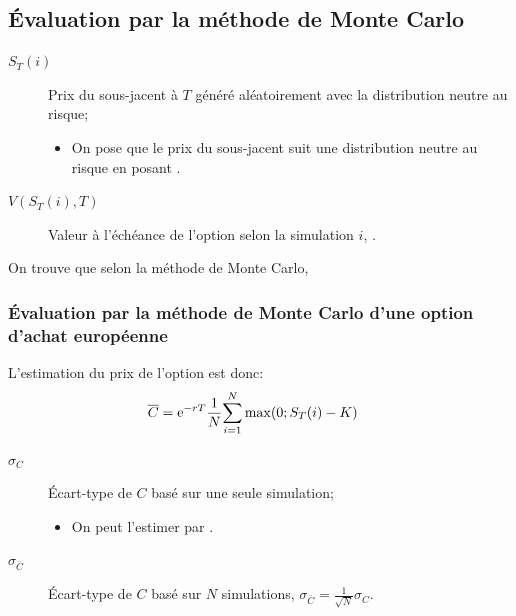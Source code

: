 \documentclass[10pt, french]{article}
\begin{document}
\begin{multicols*}{2}
\columnbreak
\subsection{Évaluation par la méthode de Monte Carlo}
\begin{distributions}[Notation]
\begin{description}
	\item[$S_{T}(i)$]	Prix du sous-jacent à $T$ généré aléatoirement avec la distribution neutre au risque;
		\begin{itemize}
		\item	On pose que le prix du sous-jacent suit une distribution neutre au risque en posant 
 .
		\end{itemize}
	\item[$V(S_{T}(i), T)$]	Valeur à l'échéance de l'option selon la simulation $i$, .
\end{description}
\end{distributions}

On trouve que selon la méthode de Monte Carlo, 

\subsubsection*{Évaluation par la méthode de Monte Carlo d'une option d'achat européenne}
L'estimation du prix de l'option est donc:
\begin{align*}
	\overline{C}
	&=	\textrm{e}^{-rT} \frac{1}{N} \overset{N}{\underset{i	=	1}{\sum}} \max(0; S_{T}(i)	-	K)
\end{align*}

\begin{distributions}[Notation]
\begin{description}
	\item[$\sigma_{C}$]	Écart-type de $C$ basé sur une seule simulation;
		\begin{itemize}
		\item	On peut l'estimer par .
		\end{itemize}
	\item[$\sigma_{\overline{C}}$]	Écart-type de $C$ basé sur $N$ simulations, $\sigma_{\overline{C}}	=	\frac{1}{\sqrt{N}}\sigma_{C}$.
\end{description}
\end{distributions}


\end{multicols*}
\end{document}
